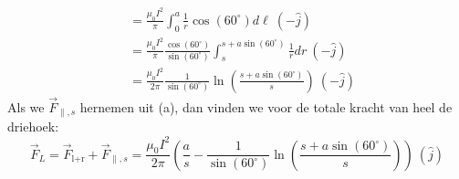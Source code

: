 \begin{enumerate}[(a)]
\begin{description}[labelwidth=1.5cm, leftmargin=!]
\begin{align*}
                                &= \frac{\mu_0I^2}{\pi} \int_0^a \frac{1}{r} \cos(60^\circ)d\ell \ (-\hat{j}) \\
                                &= \frac{\mu_0I^2}{\pi} \frac{\cos(60^\circ)}{\sin(60^\circ)} \int_{s}^{s+a\sin(60^\circ)} \frac{1}{r} dr \ (-\hat{j}) \\
                                &= \frac{\mu_0I^2}{2\pi} \frac{1}{\sin(60^\circ)} \ln\left(\frac{s+a\sin(60^\circ)}{s}\right) \ (-\hat{j})
                        \end{align*}
                        Als we $\vec{F}_{\parallel, s}$ hernemen uit (a), dan vinden we voor de totale kracht van heel de driehoek:
                        \begin{equation*}
                            \vec{F}_L = \vec{F}_{\text{l+r}} + \vec{F}_{\parallel, s} = \frac{\mu_0I^2}{2\pi}\left(\frac{a}{s} - \frac{1}{\sin(60^\circ)}\ln\left(\frac{s+a\sin(60^\circ)}{s}\right)\right)  \ (\hat{j})
                        \end{equation*}
        \end{description}
        
\end{enumerate}

\vspace{1cm}